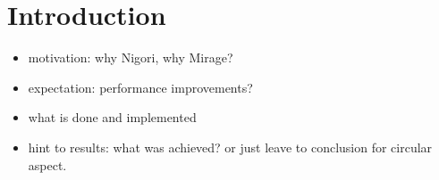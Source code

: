 \chapter{Introduction}
\setcounter{page}{1}

\begin{itemize}
  \item motivation: why Nigori, why Mirage? \cite{readme}
  \item expectation: performance improvements?
  \item what is done and implemented
  \item hint to results: what was achieved? or just leave to conclusion for circular aspect.
\end{itemize}
